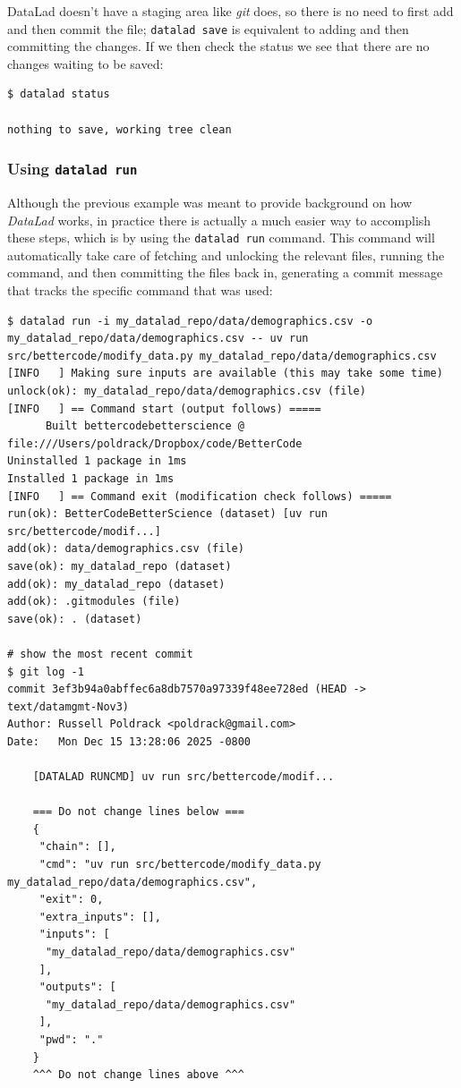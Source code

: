 DataLad doesn't have a staging area like \textit{git} does, so there is no need to first add and then commit the file; \texttt{datalad save} is equivalent to adding and then committing the changes. If we then check the status we see that there are no changes waiting to be saved:

\begin{lstlisting}[style=shellshort]
$ datalad status

nothing to save, working tree clean
\end{lstlisting}

\subsubsection{Using \texttt{datalad run}}

Although the previous example was meant to provide background on how \textit{DataLad} works, in practice there is actually a much easier way to accomplish these steps, which is by using the \texttt{datalad run} command. This command will automatically take care of fetching and unlocking the relevant files, running the command, and then committing the files back in, generating a commit message that tracks the specific command that was used:

\begin{lstlisting}[style=shell]
$ datalad run -i my_datalad_repo/data/demographics.csv -o my_datalad_repo/data/demographics.csv -- uv run src/bettercode/modify_data.py my_datalad_repo/data/demographics.csv
[INFO   ] Making sure inputs are available (this may take some time)
unlock(ok): my_datalad_repo/data/demographics.csv (file)
[INFO   ] == Command start (output follows) =====
      Built bettercodebetterscience @ file:///Users/poldrack/Dropbox/code/BetterCode
Uninstalled 1 package in 1ms
Installed 1 package in 1ms
[INFO   ] == Command exit (modification check follows) =====
run(ok): BetterCodeBetterScience (dataset) [uv run src/bettercode/modif...]
add(ok): data/demographics.csv (file)
save(ok): my_datalad_repo (dataset)
add(ok): my_datalad_repo (dataset)
add(ok): .gitmodules (file)
save(ok): . (dataset)

# show the most recent commit
$ git log -1
commit 3ef3b94a0abffec6a8db7570a97339f48ee728ed (HEAD -> text/datamgmt-Nov3)
Author: Russell Poldrack <poldrack@gmail.com>
Date:   Mon Dec 15 13:28:06 2025 -0800

    [DATALAD RUNCMD] uv run src/bettercode/modif...

    === Do not change lines below ===
    {
     "chain": [],
     "cmd": "uv run src/bettercode/modify_data.py my_datalad_repo/data/demographics.csv",
     "exit": 0,
     "extra_inputs": [],
     "inputs": [
      "my_datalad_repo/data/demographics.csv"
     ],
     "outputs": [
      "my_datalad_repo/data/demographics.csv"
     ],
     "pwd": "."
    }
    ^^^ Do not change lines above ^^^
\end{lstlisting}

